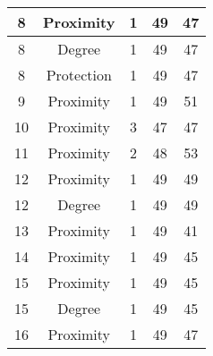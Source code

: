 \documentclass[results.tex]{subfiles}
\begin{document}
\begin{center}
\begin{tabular}{| c || c | c | c | c |}
            \hline
            8                       & Proximity                    & 1                      & 49                      & 47                   \\
            \hline
            8                       & Degree                       & 1                      & 49                      & 47                   \\
            \hline
            8                       & Protection                   & 1                      & 49                      & 47                   \\
            \hline
            9                       & Proximity                    & 1                      & 49                      & 51                   \\
            \hline
            10                      & Proximity                    & 3                      & 47                      & 47                   \\
            \hline
            11                      & Proximity                    & 2                      & 48                      & 53                   \\
            \hline
            12                      & Proximity                    & 1                      & 49                      & 49                   \\
            \hline
            12                      & Degree                       & 1                      & 49                      & 49                   \\
            \hline
            13                      & Proximity                    & 1                      & 49                      & 41                   \\
            \hline
            14                      & Proximity                    & 1                      & 49                      & 45                   \\
            \hline
            15                      & Proximity                    & 1                      & 49                      & 45                   \\
            \hline
            15                      & Degree                       & 1                      & 49                      & 45                   \\
            \hline
            16                      & Proximity                    & 1                      & 49                      & 47                   \\

\end{tabular}
\end{center}
\end{document}
